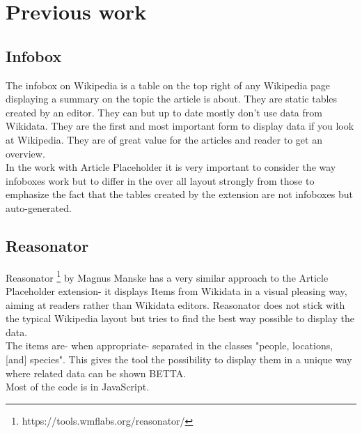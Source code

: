 \section{Previous work}
\subsection{Infobox}
The infobox on Wikipedia is a table on the top right of any Wikipedia page displaying a summary on the topic the article is about. They are static tables created by an editor. They can but up to date mostly don't use data from Wikidata. They are the first and most important form to display data if you look at Wikipedia. They are of great value for the articles and reader to get an overview. \\
In the work with Article Placeholder it is very important to consider the way infoboxes work but to differ in the over all layout strongly from those to emphasize the fact that the tables created by the extension are not infoboxes but auto-generated. 

\subsection{Reasonator}
Reasonator \footnote{https://tools.wmflabs.org/reasonator/} by Magnus Manske has a very similar approach to the Article Placeholder extension- it displays Items from Wikidata in a visual pleasing way, aiming at readers rather than Wikidata editors. Reasonator does not stick with the typical Wikipedia layout but tries to find the best way possible to display the data. \\
The items are- when appropriate- separated in the classes   "people, locations, [and] species".  This gives the tool the possibility to display them in a unique way where related data can be shown BETTA. \\
Most of the code is in JavaScript. 

